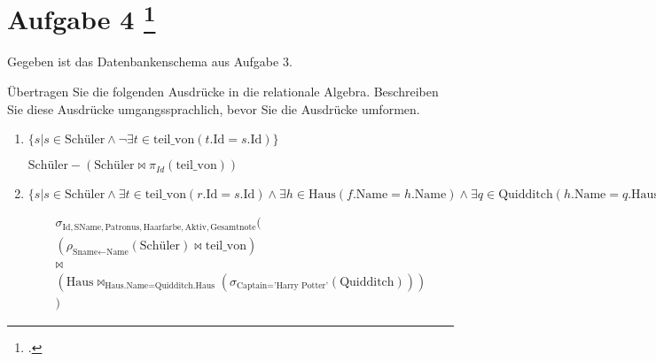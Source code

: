 \documentclass{lehramt-informatik-aufgabe}
\begin{document}
\section{Aufgabe 4
\footcite{46116:2019:09}}

Gegeben ist das Datenbankenschema aus Aufgabe 3.

\bigskip

\noindent
Übertragen Sie die folgenden Ausdrücke in die relationale Algebra.
Beschreiben Sie diese Ausdrücke umgangssprachlich, bevor Sie die
Ausdrücke umformen.

\begin{enumerate}


\item $\{ s | s \in \text{Schüler} \land \neg \exists t \in \text{teil\_von} (t.\text{Id} = s.\text{Id}) \}$

\begin{liAntwort}
$\text{Schüler} - (\text{Schüler} \bowtie \pi_{Id}(\text{teil\_von}))$
\end{liAntwort}


\item $\{ s |
s \in \text{Schüler} \land
\exists t \in \text{teil\_von} (r.\text{Id} = s.\text{Id}) \land
\exists h \in \text{Haus} (f.\text{Name} = h.\text{Name}) \land
\exists q \in \text{Quidditch} (h.\text{Name} = q.\text{Haus} \land q.\text{Captain} = \text{'Harry Potter'}) \}$

\begin{liAntwort}
\begin{multline*}
\sigma_{\text{Id}, \text{SName}, \text{Patronus}, \text{Haarfarbe}, \text{Aktiv}, \text{Gesamtnote}} (\\
  (
  \rho_{\text{Sname} \leftarrow \text{Name}}(\text{Schüler})
  \bowtie
  \text{teil\_von}
  )\\
  \bowtie\\
  (
    \text{Haus}
    \bowtie_{\text{Haus.Name} = \text{Quidditch.Haus}}
    (\sigma_{\text{Captain} = \text{'Harry Potter'}} (\text{Quidditch}))
  )\\
)
\end{multline*}
\end{liAntwort}

\end{enumerate}
\end{document}
